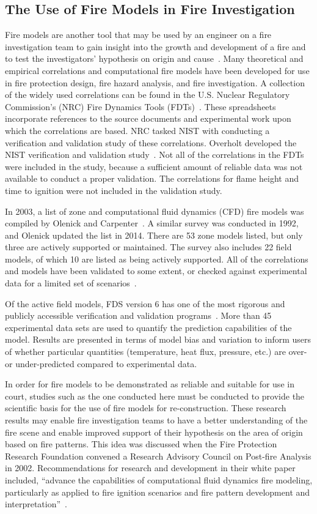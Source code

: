 \documentclass[twoside]{uocthesis}
\begin{document}
\subsection{The Use of Fire Models in Fire Investigation}
Fire models are another tool that may be used by an engineer on a fire investigation team to gain insight into the growth and development of a fire and to test the investigators' hypothesis on origin and cause~\cite{Sutula:2001}.  Many theoretical and empirical correlations and computational fire models have been developed for use in fire protection design, fire hazard analysis, and fire investigation.  A collection of the widely used correlations can be found in the U.S. Nuclear Regulatory Commission’s (NRC) Fire Dynamics Tools (FDTs)~\cite{NUREG_1805}. These spreadsheets incorporate references to the source documents and experimental work upon which the correlations are based. NRC tasked NIST with conducting a verification and validation study of these correlations. Overholt developed the NIST verification and validation study~\cite{Overholt:2014}. Not all of the correlations in the FDTs were included in the study, because a sufficient amount of reliable data was not available to conduct a proper validation.  The correlations for flame height and time to ignition were not included in the validation study.

In 2003, a list of zone and computational fluid dynamics (CFD) fire models was compiled by Olenick and Carpenter~\cite{Olenick:2003}. A similar survey was conducted in 1992, and Olenick updated the list in 2014. There are 53 zone models listed, but only three are actively supported or maintained.  The survey also includes 22 field models, of which 10 are listed as being actively supported.  All of the correlations and models have been validated to some extent, or checked against experimental data for a limited set of scenarios~\cite{ASTM_E1355}.

Of the active field models, FDS version 6 has one of the most rigorous and publicly accessible verification and validation programs~\cite{FDS_Verification_Guide,FDS_Validation_Guide}. More than 45 experimental data sets are used to quantify the prediction capabilities of the model.  Results are presented in terms of model bias and variation to inform users of whether particular quantities (temperature, heat flux, pressure, etc.) are over- or under-predicted compared to experimental data.  

In order for fire models to be demonstrated as reliable and suitable for use in court, studies such as the one conducted here must be conducted to provide the scientific basis for the use of fire models for re-construction.  These research results may enable fire investigation teams to have a better understanding of the fire scene and enable improved support of their hypothesis on the area of origin based on fire patterns.  This idea was discussed when the Fire Protection Research Foundation convened a Research Advisory Council on Post-fire Analysis in 2002.  Recommendations for research and development in their white paper included, ``advance the capabilities of computational fluid dynamics fire modeling, particularly as applied to fire ignition scenarios and fire pattern development and interpretation''~\cite{RAC:2002}.
\end{document}
